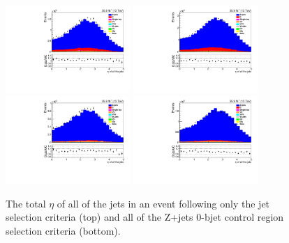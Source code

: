 \begin{figure}[ht]
\centering
\includegraphics[width=0.42\textwidth]{figs/background-estimation/plots/unblinded/DY_control_old_prompt_ee_ttbarInc/totalJetEta_SingleTop_jetSel_ee.pdf}
\includegraphics[width=0.42\textwidth]{figs/background-estimation/plots/unblinded/DY_control_old_prompt_mumu_ttbarInc/totalJetEta_SingleTop_jetSel_mumu.pdf}
\\
\includegraphics[width=0.42\textwidth]{figs/background-estimation/plots/unblinded/DY_control_old_prompt_ee_ttbarInc/totalJetEta_SingleTop_wMass_ee.pdf}
\includegraphics[width=0.42\textwidth]{figs/background-estimation/plots/unblinded/DY_control_old_prompt_mumu_ttbarInc/totalJetEta_SingleTop_wMass_mumu.pdf}
\caption{
The total $\eta$ of all of the jets in an event following only the jet selection criteria (top) and all of the Z+jets 0-bjet control region selection criteria (bottom).
}
\label{fig:CR_LO_totalJetEta}
\end{figure}

